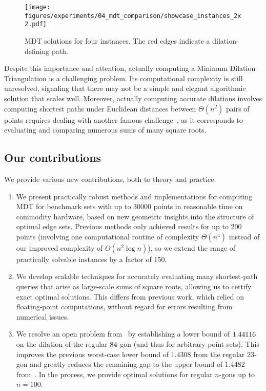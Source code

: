 \begin{figure}
    \texttt{[image: figures/experiments/04\_mdt\_comparison/showcase\_instances\_2x2.pdf]}
    \caption{MDT solutions for four instances. The red edges indicate a dilation-defining path.}
    \label{fig:example-instances}
\end{figure}

Despite this importance and attention, actually computing a Minimum Dilation
Triangulation is a challenging problem. Its computational
complexity is still unresolved, signaling that there may not be a simple and
elegant algorithmic solution that scales well. Moreover, actually computing
accurate dilations involves computing shortest paths under Euclidean distances
between $\Theta(n^2)$ pairs of points requires dealing with another famous 
challenge~\cite{o1981advanced,TOPP,bloemer1991computing,eisenbrand2024improved},
as it corresponds to evaluating and comparing numerous sums of many square roots.

\subsection{Our contributions}
We provide various new contributions, both to theory and practice.

\begin{enumerate}
\item We present practically robust methods and implementations for computing
 MDT for benchmark sets with up to \num{30000} points in reasonable time on
commodity hardware, based on new geometric insights into the structure of optimal
edge sets. 
Previous methods only achieved results for up to \num{200} points
(involving one computational routine of complexity $\Theta(n^4)$ 
instead of our improved complexity of $O(n^2\log n)$), so we extend
the range of practically solvable instances by a factor of \num{150}. 
\item We develop scalable techniques for accurately evaluating many shortest-path queries 
that arise as large-scale sums of square roots, allowing us to certify exact optimal solutions.
This differs from previous work, which relied on floating-point computations, without regard for errors resulting from numerical issues.
\item We resolve an open problem from~\cite{DBLP:journals/ijcga/DumitrescuG16}
by establishing a lower bound of $1.44116$ on the dilation of the regular $84$-gon
(and thus for arbitrary point sets).  
This improves the previous worst-case lower bound of $1.4308$ 
from the regular $23$-gon and greatly reduces the remaining gap to the upper
bound of $1.4482$ from~\cite{DBLP:journals/comgeo/SattariI19}.
In the process, we provide optimal solutions for regular $n$-gons up to $n=100$.
\end{enumerate}

